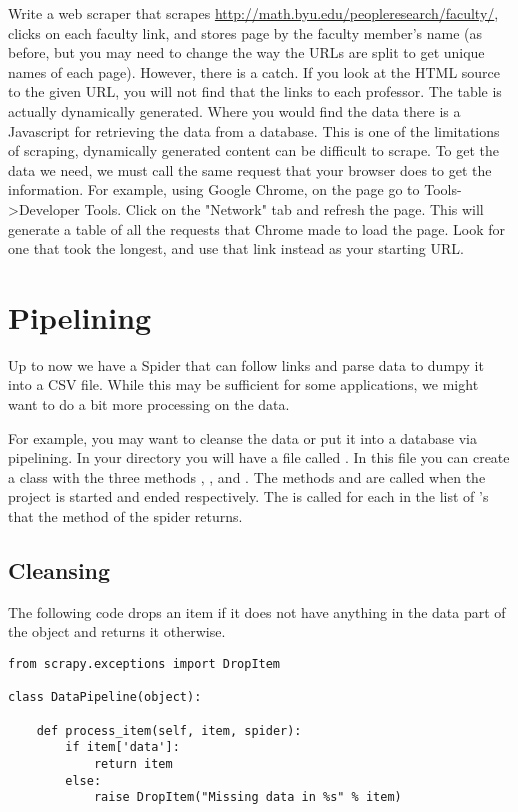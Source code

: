 \begin{problem}
Write a web scraper that scrapes \url{http://math.byu.edu/peopleresearch/faculty/}, clicks on each faculty link, and stores page by the faculty member's name (as before, but you may need to change the way the URLs are split to get unique names of each page). 
However, there is a catch. 
If you look at the HTML source to the given URL, you will not find that the links to each professor. 
The table is actually dynamically generated. 
Where you would find the data there is a Javascript for retrieving the data from a database.
This is one of the limitations of scraping, dynamically generated content can be difficult to scrape. 
To get the data we need, we must call the same request that your browser does to get the information. 
For example, using Google Chrome, on the page go to Tools->Developer Tools. Click on the "Network" tab and refresh the page. 
This will generate a table of all the requests that Chrome made to load the page. 
Look for one that took the longest, and use that link instead as your starting URL.
\end{problem}

\section*{Pipelining}
Up to now we have a Spider that can follow links and parse data to dumpy it into a CSV file. 
While this may be sufficient for some applications, we might want to do a bit more processing on the data.

For example, you may want to cleanse the data or put it into a database via pipelining. 
In your directory  you will have a file called . 
In this file you can create a class with the three methods , , and . The methods  and  are called when the project is started and ended respectively.
The  is called for each  in the list of 's that the  method of the spider returns.

\subsection*{Cleansing}
The following code drops an item if it does not have anything in the data part of the object and returns it otherwise.
\begin{lstlisting}
from scrapy.exceptions import DropItem

class DataPipeline(object):

    def process_item(self, item, spider):
        if item['data']:
            return item
        else:
            raise DropItem("Missing data in %s" % item)
\end{lstlisting}

